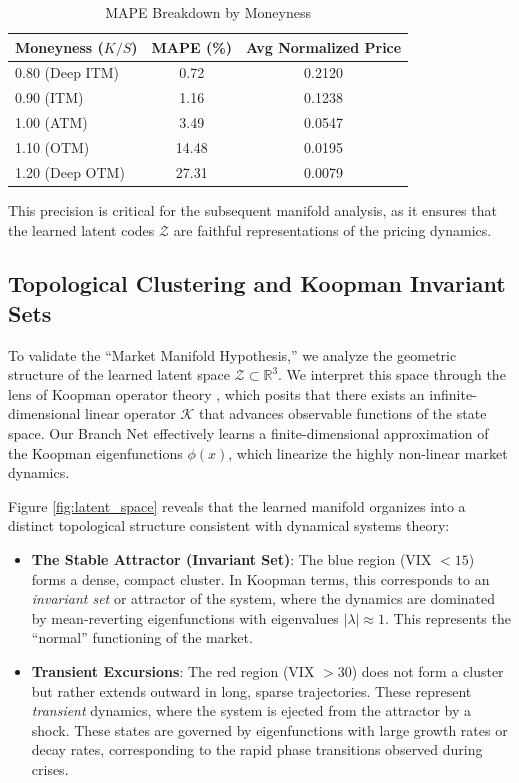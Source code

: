 \documentclass{article}
\newcommand{\bb}{\mathbb}
\begin{document}
\begin{table}[h]
    \centering
    \caption{MAPE Breakdown by Moneyness}
    \label{tab:mape_breakdown}
    \begin{tabular}{lcc}
        \toprule
        \textbf{Moneyness ($K/S$)} & \textbf{MAPE (\%)} & \textbf{Avg Normalized Price} \\
        \midrule
        0.80 (Deep ITM) & 0.72 & 0.2120 \\
        0.90 (ITM) & 1.16 & 0.1238 \\
        1.00 (ATM) & 3.49 & 0.0547 \\
        1.10 (OTM) & 14.48 & 0.0195 \\
        1.20 (Deep OTM) & 27.31 & 0.0079 \\
        \bottomrule
    \end{tabular}
\end{table}

This precision is critical for the subsequent manifold analysis, as it ensures that the learned latent codes \(\mathcal{Z}\) are faithful representations of the pricing dynamics.

\subsection{Topological Clustering and Koopman Invariant Sets}
To validate the ``Market Manifold Hypothesis,'' we analyze the geometric structure of the learned latent space \(\mathcal{Z} \subset \bb{R}^3\). We interpret this space through the lens of Koopman operator theory \citep{brunton2021modern}, which posits that there exists an infinite-dimensional linear operator \(\mathcal{K}\) that advances observable functions of the state space. Our Branch Net effectively learns a finite-dimensional approximation of the Koopman eigenfunctions \(\phi(x)\), which linearize the highly non-linear market dynamics.

Figure \ref{fig:latent_space} reveals that the learned manifold organizes into a distinct topological structure consistent with dynamical systems theory:

\begin{itemize}
    \item \textbf{The Stable Attractor (Invariant Set)}: The blue region (VIX \(< 15\)) forms a dense, compact cluster. In Koopman terms, this corresponds to an \emph{invariant set} or attractor of the system, where the dynamics are dominated by mean-reverting eigenfunctions with eigenvalues \(|\lambda| \approx 1\). This represents the ``normal'' functioning of the market.
    \item \textbf{Transient Excursions}: The red region (VIX \(> 30\)) does not form a cluster but rather extends outward in long, sparse trajectories. These represent \emph{transient} dynamics, where the system is ejected from the attractor by a shock. These states are governed by eigenfunctions with large growth rates or decay rates, corresponding to the rapid phase transitions observed during crises.
\end{itemize}
\end{document}
